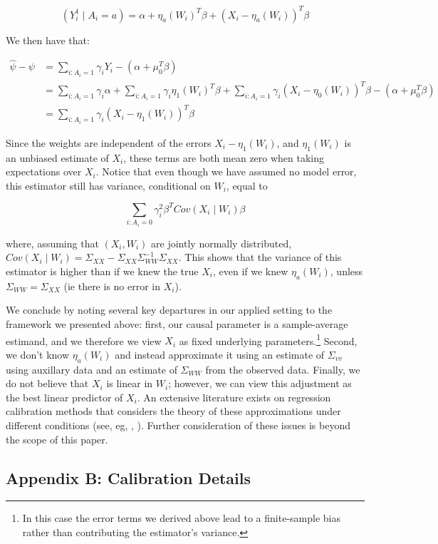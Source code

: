 \documentclass[12pt]{article}
\begin{document}
$$
(Y_i^1 \mid A_i = a) = \alpha + \eta_a(W_i)^T\beta + (X_i - \eta_a(W_i))^T\beta
$$

We then have that:

\begin{align*}
    \hat{\psi} - \psi &= \sum_{i: A_i = 1}\gamma_iY_i - (\alpha + \mu_0^T\beta) \\
    &= \sum_{i: A_i = 1}\gamma_i\alpha + \sum_{i: A_i = 1}\gamma_i\eta_1(W_i)^T\beta + \sum_{i: A_i = 1}\gamma_i(X_i - \eta_0(W_i))^T\beta - (\alpha + \mu_0^T\beta) \\
    &= \sum_{i: A_i = 1}\gamma_i(X_i - \eta_1(W_i))^T\beta
\end{align*}

Since the weights are independent of the errors $X_i - \eta_1(W_i)$, and $\eta_1(W_i)$ is an unbiased estimate of $X_i$, these terms are both mean zero when taking expectations over $X_i$. Notice that even though we have assumed no model error, this estimator still has variance, conditional on $W_i$, equal to

$$
\sum_{i: A_i = 0} \gamma_i^2\beta^TCov(X_i \mid W_i)\beta
$$

where, assuming that $(X_i, W_i)$ are jointly normally distributed, $Cov(X_i \mid W_i) = \Sigma_{XX} - \Sigma_{XX}\Sigma_{WW}^{-1}\Sigma_{XX}$. This shows that the variance of this estimator is higher than if we knew the true $X_i$, even if we knew $\eta_a(W_i)$, unless $\Sigma_{WW} = \Sigma_{XX}$ (ie there is no error in $X_i$). 

We conclude by noting several key departures in our applied setting to the framework we presented above: first, our causal parameter is a sample-average estimand, and we therefore we view $X_i$ as fixed underlying parameters.\footnote{In this case the error terms we derived above lead to a finite-sample bias rather than contributing the estimator's variance.} Second, we don't know $\eta_a(W_i)$ and instead approximate it using an estimate of $\Sigma_{vv}$ using auxillary data and an estimate of $\Sigma_{WW}$ from the observed data. Finally, we do not believe that $X_i$ is linear in $W_i$; however, we can view this adjustment as the best linear predictor of $X_i$. An extensive literature exists on regression calibration methods that considers the theory of these approximations under different conditions (see, eg, \cite{gleser1992importance}, \cite{carroll2006measurement}). Further consideration of these issues is beyond the scope of this paper.

\subsection{Appendix B: Calibration Details}
\end{document}
